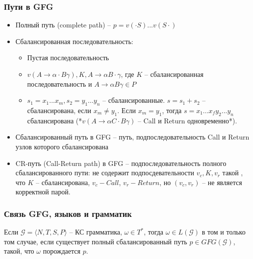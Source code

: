 \documentclass{beamer}
\begin{document}
\begin{frame}
    \transwipe[direction=90]
    \frametitle{Пути в GFG}
    \begin{itemize}
        \item Полный путь (complete path) -- $p=v(\cdot S)...v(S\cdot)$
        \item Сбалансированная последовательность:
        \begin{itemize}
            \item Пустая последовательность
            \item $v(A \rightarrow \alpha \cdot B \gamma),K,A \rightarrow \alpha B \cdot \gamma$, где $K$ -- сбалансированная последовательность и $A \rightarrow \alpha  B \gamma \in P$
            \item $s_1 = x_1...x_m, s_2 = y_1 ... y_n $ -- сбалансированные. $s=s_1+s_2$ -- сбалансирована, если $x_m \neq y_1$. Если $x_m=y_1$, тогда $s = x_1...x_f y_2 ... y_n$ сбалансирована
                  (*$v(A \rightarrow \alpha C \cdot B \gamma)$ -- Call и Return одновременно*).                                                                                                                                                                           
        \end{itemize}
        \item Сбалансированный путь в GFG -- путь, подпоследовательность Call и Return узлов которого сбалансирована
        \item CR-путь (Call-Return path) в GFG -- подпоследовательность полного сбалансированного пути: не содержит подпосдевательности $v_c, K, v_r$ такой
        , что $K$ -- сбалансирована, $v_c - Call$, $v_r - Return$, но $(v_c,v_r)$ -- не является корректной парой. 
    \end{itemize}
\end{frame}

\begin{frame}
    \transwipe[direction=90]
    \frametitle{Связь GFG, языков и грамматик}
    \begin{theorem}
        Если $\mathcal{G} = \langle N, T, S, P \rangle$ -- КС грамматика, $\omega \in T^{*}$, тогда $\omega \in L(\mathcal{G})$ в том и только том случае, если 
         существует полный сбалансированный путь $p \in GFG(\mathcal{G})$, такой, что $\omega$ порождается $p$.
    \end{theorem}
\end{frame}
\end{document}
